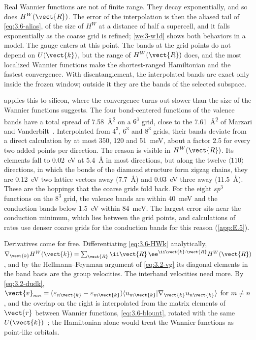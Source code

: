 Real Wannier functions are not of finite range. They decay exponentially, and so does $H^W(\vect{R})$. The error of the interpolation is then the aliased tail of \cref{eq:3.6-alias}, of the size of $H^W$ at a distance of half a supercell, and it falls exponentially as the coarse grid is refined; \cref{we:3-w1d} shows both behaviors in a model. The gauge enters at this point. The bands at the grid points do not depend on $U(\vect{k})$, but the range of $H^W(\vect{R})$ does, and the most localized Wannier functions make the shortest-ranged Hamiltonian and the fastest convergence. With disentanglement, the interpolated bands are exact only inside the frozen window; outside it they are the bands of the selected subspace.

 applies this to silicon, where the convergence turns out slower than the size of the Wannier functions suggests. The four bond-centered functions of the valence bands have a total spread of \SI{7.58}{\angstrom^2} on a $6^3$ grid, close to the \SI{7.61}{\angstrom^2} of Marzari and Vanderbilt~\cite[Table~I]{marzari1997maximally}. Interpolated from $4^3$, $6^3$ and $8^3$ grids, their bands deviate from a direct calculation by at most 350, 120 and \SI{51}{meV}, about a factor 2.5 for every two added points per direction. The reason is visible in $H^W(\vect{R})$. Its elements fall to \SI{0.02}{eV} at \SI{5.4}{\angstrom} in most directions, but along the twelve $\langle110\rangle$ directions, in which the bonds of the diamond structure form zigzag chains, they are \SI{0.12}{eV} two lattice vectors away (\SI{7.7}{\angstrom}) and \SI{0.03}{eV} three away (\SI{11.5}{\angstrom}). These are the hoppings that the coarse grids fold back. For the eight $sp^3$ functions on the $8^3$ grid, the valence bands are within \SI{40}{meV} and the conduction bands below \SI{1.5}{eV} within \SI{84}{meV}. The largest error sits near the conduction minimum, which lies between the grid points, and calculations of rates use denser coarse grids for the conduction bands for this reason (\cref{app:E.5}).

Derivatives come for free. Differentiating \cref{eq:3.6-HWk} analytically, $\nabla_{\vect{k}}H^W(\vect{k}) = \sum_{\vect{R}}\ii\vect{R}\,\ee^{\ii\vect{k}\cdot\vect{R}}H^W(\vect{R})$, and by the Hellmann--Feynman argument of \cref{eq:3.2-vg} its diagonal elements in the band basis are the group velocities. The interband velocities need more. By \cref{eq:3.2-dudk}, $\vect{v}_{mn} = (\varepsilon_{n\vect{k}} - \varepsilon_{m\vect{k}})\langle u_{m\vect{k}}|\nabla_{\vect{k}}u_{n\vect{k}}\rangle$ for $m \ne n$, and the overlap on the right is interpolated from the matrix elements of $\vect{r}$ between Wannier functions, \cref{eq:3.6-blount}, rotated with the same $U(\vect{k})$~\cite[Eqs.~(106)--(109)]{marzari2012maximally}; the Hamiltonian alone would treat the Wannier functions as point-like orbitals.

